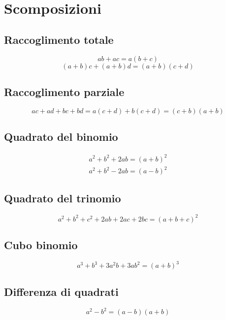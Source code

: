 \chapter{Scomposizioni}
\section{Raccoglimento totale}
\begin{equation*}
ab+ac=a(b+c)
\end{equation*}
\begin{equation*}
(a+b)c+(a+b)d=(a+b)(c+d)
\end{equation*}
\section{Raccoglimento parziale}
\begin{equation*}
ac+ad+bc+bd=a(c+d)+b(c+d)=(c+b)(a+b)
\end{equation*}
\section{Quadrato del binomio}
\begin{align*}
a^2+b^2+2ab=(a+b)^2\\
a^2+b^2-2ab=(a-b)^2
\end{align*}
\section{Quadrato del trinomio}
\begin{equation*}
a^2+b^2+c^2+2ab+2ac+2bc=(a+b+c)^2
\end{equation*}
\section{Cubo binomio}
\begin{equation*}
a^3+b^3+3a^2b+3ab^2=(a+b)^3
\end{equation*}
\section{Differenza di quadrati}
\begin{equation*}
a^2-b^2=(a-b)(a+b)
\end{equation*}
